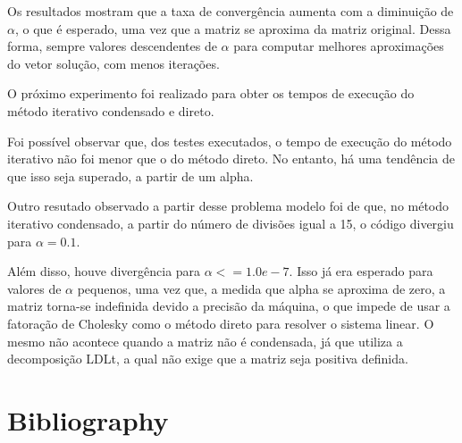 \documentclass[12pt]{article}
\begin{document}
Os resultados mostram que a taxa de convergência aumenta com a diminuição de \(\alpha\), o que é esperado, uma vez que a matriz se aproxima 
da matriz original. Dessa forma, sempre valores descendentes de \(\alpha\) para computar melhores aproximações do vetor solução, com menos 
iterações.


O próximo experimento foi realizado para obter os tempos de execução do método iterativo condensado e direto. %

Foi possível observar que, dos testes executados, o tempo de execução do método iterativo não foi menor que o do método direto. No entanto, há uma 
tendência de que isso seja superado, a partir de um alpha.

Outro resutado observado a partir desse problema modelo foi de que, no método iterativo condensado, a partir do número de divisões igual a 15, 
o código divergiu para \(\alpha=0.1\). %

Além disso, houve divergência para \(\alpha<=1.0e-7\). Isso já era esperado para valores de \(\alpha\) pequenos, uma vez que, a medida que 
alpha se aproxima de zero, a matriz torna-se indefinida devido a precisão da máquina, o que impede de usar a fatoração de Cholesky como o 
método direto para resolver o sistema linear. O mesmo não acontece quando a matriz não é condensada, já que utiliza a decomposição LDLt, a 
qual não exige que a matriz seja positiva definida.

\section{Bibliography}
\end{document}
